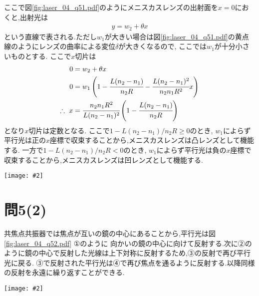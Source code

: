 \documentclass[uplatex,a4j,11pt,dvipdfmx]{jsarticle}
\makeatletter
\def\fgcaption{\def\@captype{figure}\caption}
\newcommand{\mfig}[3][width=15cm]{
\begin{center}
\texttt{[image: \#2]}
\fgcaption{#3 \label{fig:#2}}
\end{center}
}
\makeatother
\begin{document}
ここで図\ref{fig:laser_04_q51.pdf}のようにメニスカスレンズの出射面を$x=0$におくと,出射光は
\begin{align}
  y=w_2+\theta x
\end{align}
という直線で表される.ただし$w_1$が大きい場合は図\ref{fig:laser_04_q51.pdf}の黄点線のようにレンズの曲率による変位$\delta$が大きくなるので,
ここでは$w_1$が十分小さいものとする.
ここで$x$切片は
\begin{align}
  \begin{split}
    0&=w_2+\theta x\\
    0&=w_1\left(1-\cfrac{L(n_2-n_1)}{n_2R}-\cfrac{L(n_2-n_1)^2}{n_2n_1R^2}x\right)\\
    \therefore\ x&=\cfrac{n_2n_1R^2}{L(n_2-n_1)^2}\left(1-\cfrac{L(n_2-n_1)}{n_2R}\right)
  \end{split}
\end{align}
となり$x$切片は定数となる.
ここで$1-L(n_2-n_1)/n_2R\geq0$のとき, $w_1$によらず平行光は正の$x$座標で収束することから,メニスカスレンズは凸レンズとして機能する.
一方で$1-L(n_2-n_1)/n_2R<0$のとき, $w_1$によらず平行光は負の$x$座標で収束することから,メニスカスレンズは凹レンズとして機能する.
\mfig[width=12cm]{laser_04_q51.pdf}{メニスカスレンズに平行光を入れた場合の模式図}
\section*{問5(2)}
共焦点共振器では焦点が互いの鏡の中心にあることから,平行光は図\ref{fig:laser_04_q52.pdf} ①のように
向かいの鏡の中心に向けて反射する.次に②のように鏡の中心で反射した光線は上下対称に反射するため,③の反射で再び平行光に戻る.
③で反射された平行光は④で再び焦点を通るように反射する.以降同様の反射を永遠に繰り返すことができる.
\mfig[width=10cm]{laser_04_q52.pdf}{共焦点共振器の模式図}
\end{document}

